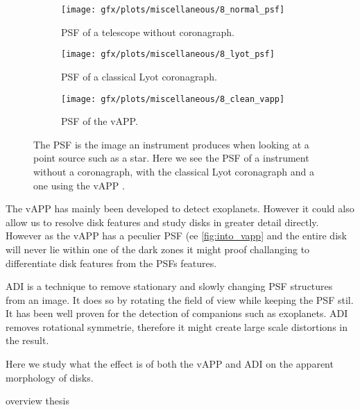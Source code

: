 \begin{figure}[h!]
      \begin{subfigure}[t]{0.5\textwidth}
        \texttt{[image: gfx/plots/miscellaneous/8\_normal\_psf]}
        \caption{\ac{PSF} of a telescope without coronagraph.}
        \label{fig:classic_psf}
      \end{subfigure}
      \begin{subfigure}[t]{0.5 \textwidth}
        \texttt{[image: gfx/plots/miscellaneous/8\_lyot\_psf]}
        \label{fig:lyot}
        \caption{\ac{PSF} of a classical Lyot coronagraph.}
      \end{subfigure}%
      
      \begin{subfigure}[]{0.5\textwidth}
        \texttt{[image: gfx/plots/miscellaneous/8\_clean\_vapp]}
        \caption{\ac{PSF} of the \ac{vAPP}.}
        \label{fig:into_vapp}
      \end{subfigure}
      
  \caption{The \ac{PSF} is the image an instrument produces when looking at a point source such as a star. Here we see the \ac{PSF} of a instrument without a coronagraph, with the classical Lyot coronagraph and a one using the \ac{vAPP} .}
  \label{fig:vapp_vs_lyot}
\end{figure}

The \ac{vAPP} has mainly been developed to detect exoplanets. However it could also allow us to resolve disk features and study disks in greater detail directly. However as the \ac{vAPP} has a peculier \ac{PSF} (ee \autoref{fig:into_vapp} and the entire disk will never lie within one of the dark zones it might proof challanging to differentiate disk features from the \acp{PSF} features. 

\ac{ADI} is a technique to remove stationary and slowly changing \ac{PSF} structures from an image. It does so by rotating the field of view while keeping the \ac{PSF} stil. It has been well proven for the detection of companions such as exoplanets. \ac{ADI} removes rotational symmetrie, therefore it might create large scale distortions in the result.

Here we study what the effect is of both the \ac{vAPP} and \ac{ADI} on the apparent morphology of disks.

overview thesis

